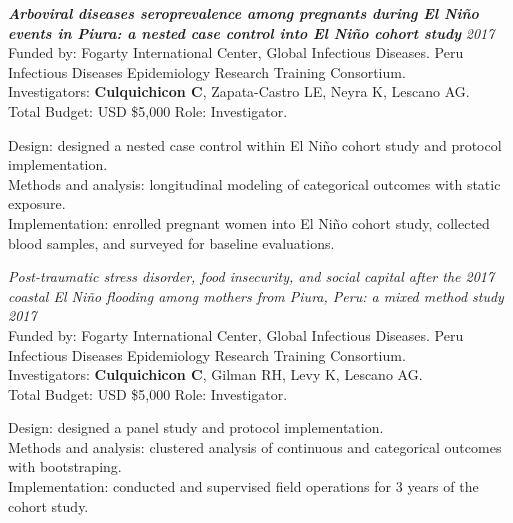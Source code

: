 \documentclass[10pt]{article}
\newenvironment{outerlist}[1][\enskip\textbullet]%
{\begin{itemize}[#1]}{\end{itemize}%
	\vspace{-0.6\baselineskip}}
\newenvironment{innerlist}[1][\enskip$\circ$]%
{\begin{compactitem}[#1]}{\end{compactitem}}
\begin{document}
\vspace{-0.25in}
\begin{outerlist}
	\item[] \textbf{\emph{Arboviral diseases seroprevalence among pregnants during El Niño events in Piura: a nested case control into El Niño cohort study}}  \hfill {\it 2017}\\
	Funded by: Fogarty International Center, Global Infectious Diseases.
	Peru Infectious Diseases Epidemiology Research Training Consortium. \\
	Investigators: {\bf Culquichicon C}, Zapata-Castro LE, Neyra K, Lescano AG.  \\
	Total Budget: USD \$5,000  \hfill Role: Investigator.
	
	\begin{innerlist}
		\item[] 	Design: designed a nested case control within El Niño cohort study and protocol implementation. \\
					Methods and analysis: longitudinal modeling of categorical outcomes with static exposure. \\
					Implementation: enrolled pregnant women into El Niño cohort study, collected blood samples, and surveyed for baseline evaluations.
	\end{innerlist}
	
\end{outerlist}

\vspace{-0.10in}
\begin{outerlist}
	\item[] {\it Post-traumatic stress disorder, food insecurity, and social capital after the 2017 coastal El Niño flooding among mothers from Piura, Peru: a mixed method study} \hfill {\it 2017}\\
	Funded by: Fogarty International Center, Global Infectious Diseases.
	Peru Infectious Diseases Epidemiology Research Training Consortium. \\
	Investigators: {\bf Culquichicon C}, Gilman RH, Levy K, Lescano AG.  \\
	Total Budget: USD \$5,000  \hfill Role: Investigator.
	
	\begin{innerlist}
		\item[] 	Design: designed a panel study and protocol implementation. \\
					Methods and analysis: clustered analysis of continuous and categorical outcomes with bootstraping. \\
					Implementation: conducted and supervised field operations for 3 years of the cohort study.
	\end{innerlist}
	
\end{outerlist}
\end{document}
